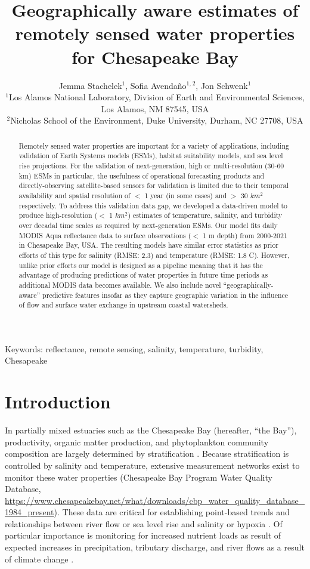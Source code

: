 \documentclass{article}
\title{Geographically aware estimates of remotely sensed water properties for Chesapeake Bay}
\author{Jemma Stachelek$^{1}$, Sofia Avendaño$^{1,}$$^{2}$, Jon Schwenk$^{1}$  \\
        \small $^{1}$Los Alamos National Laboratory, Division of Earth and Environmental Sciences, Los Alamos, NM 87545, USA \\
        \small $^{2}$Nicholas School of the Environment, Duke University, Durham, NC 27708, USA \\
}
\date{}
\begin{document}
\maketitle

\begin{abstract}
    \noindent Remotely sensed water properties are important for a variety of applications, including validation of Earth Systems models (ESMs), habitat suitability models, and sea level rise projections. For the validation of next-generation, high or multi-resolution (30-60 km) ESMs in particular, the usefulness of operational forecasting products and directly-observing satellite-based sensors for validation is limited due to their temporal availability and spatial resolution of $<$ 1 year (in some cases) and $>$ 30 $km^2$ respectively. To address this validation data gap, we developed a data-driven model to produce high-resolution ($<$ 1 $km^2$) estimates of temperature, salinity, and turbidity over decadal time scales as required by next-generation ESMs. Our model fits daily MODIS Aqua reflectance data to surface observations ($<$ 1 m depth) from 2000-2021 in Chesapeake Bay, USA. The resulting models have similar error statistics as prior efforts of this type for salinity (RMSE: 2.3) and temperature (RMSE: 1.8 C). However, unlike prior efforts our model is designed as a pipeline meaning that it has the advantage of producing predictions of water properties in future time periods as additional MODIS data becomes available. We also include novel  “geographically-aware” predictive features insofar as they capture geographic variation in the influence of flow and surface water exchange in upstream coastal watersheds.
    \end{abstract} \hspace{10pt}

Keywords: reflectance, remote sensing, salinity, temperature, turbidity, Chesapeake

\linenumbers

\section{Introduction}

In partially mixed estuaries such as the Chesapeake Bay (hereafter, “the Bay”), productivity, organic matter production, and phytoplankton community composition are largely determined by stratification \cite{xuClimateForcingSalinity2012}. Because stratification is controlled by salinity and temperature, extensive measurement networks exist to monitor these water properties (Chesapeake Bay Program Water Quality Database, \url{https://www.chesapeakebay.net/what/downloads/cbp_water_quality_database_1984_present}). These data are critical for establishing point-based trends and relationships between river flow or sea level rise and salinity or hypoxia \cite{hagyHypoxiaChesapeakeBay2004}. Of particular importance is monitoring for increased nutrient loads as result of expected increases in precipitation, tributary discharge, and river flows as a result of climate change \cite{najjarPotentialClimatechangeImpacts2010, irbyCompetingImpactsClimate2018}.
\end{document}
